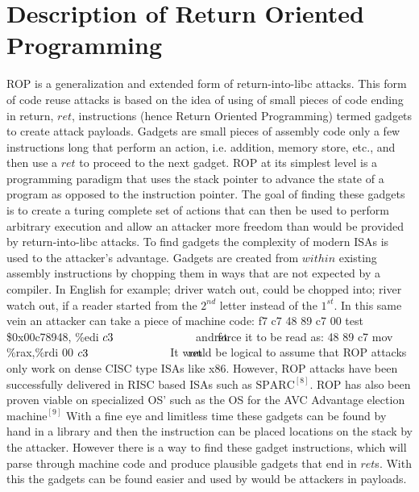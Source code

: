 \documentclass[11pt]{amsart}
\newcommand{\tab}[1]{\hspace{.2\textwidth}\rlap{#1}}
\begin{document}
\section*{Description of Return Oriented Programming}
ROP is a generalization and extended form of return-into-libc attacks. This form of code reuse attacks is based on the idea of using of small pieces of code ending in return, $ret$, instructions (hence Return Oriented Programming) termed gadgets to create attack payloads. Gadgets are small pieces of assembly code only a few instructions long that perform an action, i.e. addition, memory store, etc., and then use a $ret$ to proceed to the next gadget. ROP at its simplest level is a programming paradigm that uses the stack pointer to advance the state of a program as opposed to the instruction pointer. The goal of finding these gadgets is to create a turing complete set of actions that can then be used to perform arbitrary execution and allow an attacker more freedom than would be provided by return-into-libc attacks. \newline \newline
To find gadgets the complexity of modern ISAs is used to the attacker’s advantage. Gadgets are created from $within$ existing assembly instructions by chopping them in ways that are not expected by a compiler. In English for example; driver watch out, could be chopped into; river watch out, if a reader started from the $2^{nd}$ letter instead of the $1^{st}$. In this same vein an attacker can take a piece of machine code: \newline
\hspace*{10 mm} f7 c7 48 89 c7 00 \hspace*{10 mm} test \$0x00c78948, \%edi \newline
\hspace*{10 mm} $c3\tab{\hspace*{6 mm} ret}$ \newline 
and force it to be read as: \newline
\hspace*{10 mm} 48 89 c7 \hspace*{26 mm}mov \%rax,\%rdi \newline
\hspace*{10 mm} $00$ \newline
\hspace*{10 mm} $c3\tab{\hspace*{6 mm} ret}$ \newline \newline
It would be logical to assume that ROP attacks only work on dense CISC type ISAs like x86. However, ROP attacks have been successfully delivered in RISC based ISAs such as $\text{SPARC}^{[8]}$. ROP has also been proven viable on specialized OS' such as the OS for the AVC Advantage election $\text{machine}^{[9]}$ \newline \newline
With a fine eye and limitless time these gadgets can be found by hand in a library and then the instruction can be placed locations on the stack by the attacker. However there is a way to find these gadget instructions, which will parse through machine code and produce plausible gadgets that end in $ret$s. With this the gadgets can be found easier and used by would be attackers in payloads.
\end{document}
